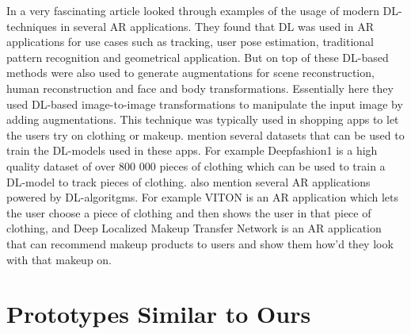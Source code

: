 	In a very fascinating article 
\textcite{minaee2022modernaugmentedrealityapplications} looked through 
examples of the usage of modern DL-techniques in several AR applications. 
They found that DL was used in AR applications for use cases such as tracking, 
user pose estimation, traditional pattern recognition and geometrical 
application. But on top of these DL-based methods were also used to generate 
augmentations for scene reconstruction, human reconstruction and face and 
body transformations. Essentially here they used DL-based image-to-image 
transformations to manipulate the input image by adding augmentations. This 
technique was typically used in shopping apps to let the users try on 
clothing or makeup. \textcite{minaee2022modernaugmentedrealityapplications} 
mention several datasets that can be used to train the DL-models used in 
these apps. For example Deepfashion1\cite{liuziwei7Deepfashion1Poster} is a 
high quality dataset of over 800 000 pieces of clothing which can be used to 
train a DL-model to track pieces of clothing. 
\textcite{minaee2022modernaugmentedrealityapplications} also mention several 
AR applications powered by DL-algoritgms. For example 
VITON\cite{hanVitonArxiv} is an AR application which lets the user choose a 
piece of clothing and then shows the user in that piece of clothing, and Deep 
Localized Makeup Transfer Network\cite{liuMakeupArxiv} is an AR application 
that can recommend makeup products to users and show them how'd they look 
with that makeup on.\par


\section{Prototypes Similar to Ours} \label{protos}

